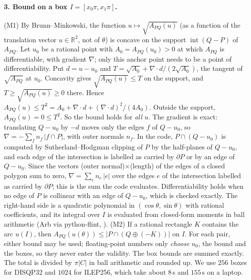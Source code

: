 \documentclass[10pt,a4paper]{article}
\newcommand{\R}{\mathbb{R}}
\begin{document}
\paragraph{3. Bound on a box $I=[x_0\pi,x_1\pi]$.} (M1) By Brunn--Minkowski, the function $u\mapsto\sqrt{A_{PQ}(u)}$ (as a function of the translation
vector $u\in\R^2$, not of $\theta$) is concave on the support $\operatorname{int}(Q-P)$ of $A_{PQ}$.
Let $u_0$ be a rational point with $A_0=A_{PQ}(u_0)>0$ at which $A_{PQ}$ is differentiable, with
gradient $\nabla$; only this anchor point needs to be a point of differentiability. Put $d=u-u_0$
and $T=\sqrt{A_0}+\nabla\cdot d/(2\sqrt{A_0})$, the tangent of $\sqrt{A_{PQ}}$ at $u_0$. Concavity gives
$\sqrt{A_{PQ}(u)}\le T$ on the support, and $T\ge\sqrt{A_{PQ}(u)}\ge0$ there. Hence
$A_{PQ}(u)\le T^2=A_0+\nabla\cdot d+(\nabla\cdot d)^2/(4A_0)$. Outside the support, $A_{PQ}(u)=0\le T^2$.
So the bound holds for \emph{all} $u$. The gradient is exact: translating $Q-u_0$ by $-d$ moves only the edges $f$ of $Q-u_0$,
so $\nabla=-\sum_f n_f\,|f\cap P|$, with outer normals $n_f$. In the code, $P\cap(Q-u_0)$ is computed by
Sutherland--Hodgman clipping of $P$ by the half-planes of $Q-u_0$, and each edge of the intersection is
labelled as carried by $\partial P$ or by an edge of $Q-u_0$. Since the vectors (outer normal)$\times$(length)
of the edges of a closed polygon sum to zero, $\nabla=\sum_e n_e\,|e|$ over the edges $e$ of the
intersection labelled as carried by $\partial P$; this is the sum the code evaluates. Differentiability holds when no edge of $P$ is collinear with an edge of $Q-u_0$, which is
checked exactly. The right-hand side is a quadratic
polynomial in $(\cos\theta,\sin\theta)$ with rational coefficients, and its integral over $I$ is
evaluated from closed-form moments in ball arithmetic (Arb via python-flint, \cite{flint}). (M2) If
a rational rectangle $K$ contains the arc $u(I)$, then $A_{PQ}(u(\theta))\le|P\cap(Q\oplus(-K))|$ on
$I$. For each pair, either bound may be used; floating-point numbers only \emph{choose} $u_0$, the
bound and the boxes, so they never enter the validity. The box bounds are summed exactly. The total is
divided by $\pi|C|$ in ball arithmetic and rounded up. We use $256$ boxes for DISQP32 and $1024$ for
ILEP256, which take about $8$\,s and $155$\,s on a laptop.
\end{document}
